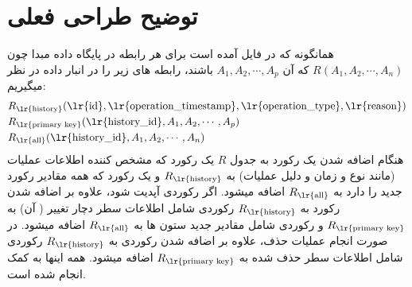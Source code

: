 \documentclass{article}
\title{\textbf{\homework}}
\author{\meAndStudentNumber}
\date{}
\newcommand{\txt}[1]{\text{\lr{#1}}}
\begin{document}
	
	\maketitle
	
	\doublespacing
	
	\section*{توضیح طراحی فعلی}
	همانگونه که در فایل 
	آمده است برای هر رابطه در پایگاه داده مبدا چون 
	$R(A_1, A_2, \cdots, A_n)$
	که 
	آن  
	$A_1, A_2, \cdots, A_p$
	باشند، رابطه های زیر را در انبار داده در نظر میگیریم:
	\begin{align*}
		&R_{\txt{history}}(\txt{id}, \txt{operation\_timestamp}, \txt{operation\_type}, \txt{reason}) \\
		&R_{\txt{primary key}}(\txt{history\_id}, A_1, A_2, \cdots, A_p) \\
		&R_{\txt{all}}(\txt{history\_id}, A_1, A_2, \cdots, A_n)
	\end{align*}
	هنگام اضافه شدن یک رکورد به جدول $R$ یک رکورد که مشخص کننده اطلاعات عملیات (مانند نوع و زمان و دلیل عملیات) به
	$R_{\txt{history}}$
و یک رکورد که همه مقادیر رکورد جدید را دارد به
	$R_{\txt{all}}$
	اضافه میشود. اگر رکوردی آپدیت شود، علاوه بر اضافه شدن رکورد به
	 $R_{\txt{history}}$ 
	رکوردی شامل اطلاعات سطر دچار تغییر ( آن) به 
	$R_{\txt{primary key}}$
	و رکوردی شامل مقادیر جدید ستون ها به 
	$R_{\txt{all}}$
	اضافه میشود. در صورت انجام عملیات حذف، علاوه بر اضافه شدن رکوردی به 
	$R_{\txt{history}}$
	رکوردی شامل اطلاعات سطر حذف شده به 
	$R_{\txt{primary key}}$
	اضافه میشود. همه اینها به کمک 
	انجام شده است.
\end{document}
